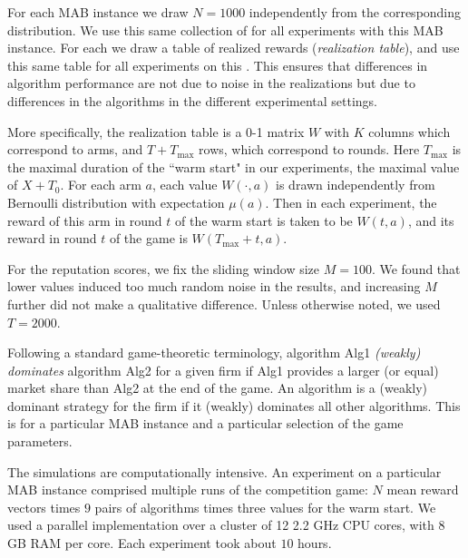 \documentclass[../competing_bandits.tex]{subfiles}
\begin{document}
For each MAB instance we draw $N = 1000$ \MRVs independently from the corresponding distribution. We use this same collection of \MRVs for all experiments with this MAB instance. For each \MRV we draw a table of realized rewards (\emph{realization table}), and use this same table for all experiments on this \MRV. This ensures that differences in algorithm performance are not due to noise in the realizations but due to differences in the algorithms in the different experimental settings.

More specifically, the realization table is a 0-1 matrix $W$ with $K$ columns which correspond to arms, and $T+T_{\max}$ rows, which correspond to rounds. Here $T_{\max}$ is the maximal duration of the ``warm start" in our experiments, \ie the maximal value of $X+T_0$. For each arm $a$, each value $W(\cdot,a)$ is drawn independently from Bernoulli distribution with expectation $\mu(a)$. Then in each experiment, the reward of this arm in round $t$ of the warm start is taken to be $W(t,a)$, and its reward in round $t$ of the game is $W(T_{\max}+t,a)$.

For the reputation scores, we fix the sliding window size $M = 100$. We found that lower values induced too much random noise in the results, and increasing $M$ further did not make a qualitative difference. Unless otherwise noted, we used $T = 2000$.

Following a standard game-theoretic terminology, algorithm Alg1 \emph{(weakly) dominates} algorithm Alg2 for a given firm if Alg1 provides a larger (or equal) market share than Alg2 at the end of the game. An algorithm is a (weakly) dominant strategy for the firm if it (weakly) dominates all other algorithms. This is for a particular MAB instance and a particular selection of the game parameters.


The simulations are computationally intensive. An experiment on a particular MAB instance comprised multiple runs of the competition game: $N$ mean reward vectors times $9$ pairs of algorithms times three values for the warm start. We used a parallel implementation over a cluster of 12 2.2 GHz CPU cores, with 8 GB RAM per core. Each experiment took about $10$ hours.
\end{document}

